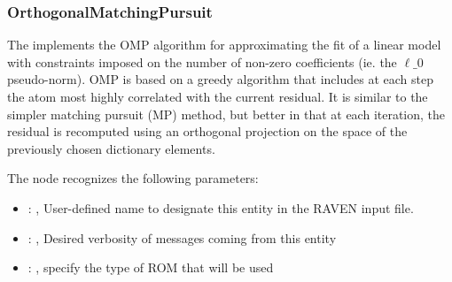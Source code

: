\subsubsection{OrthogonalMatchingPursuit}
  The                          implements the OMP algorithm for
  approximating the fit of a                         linear model with constraints imposed on the
  number of non-zero                         coefficients (ie. the $\ell\_0$ pseudo-norm). OMP is
  based on a greedy                         algorithm that includes at each step the atom most
  highly correlated                         with the current residual. It is similar to the simpler
  matching                         pursuit (MP) method, but better in that at each iteration, the
  residual                         is recomputed using an orthogonal projection on the space of the
  previously chosen dictionary elements.

  The  node recognizes the following parameters:
    \begin{itemize}
      \item {}: , 
        User-defined name to designate this entity in the RAVEN input file.
      \item {}: , 
        Desired verbosity of messages coming from this entity
      \item {}: , 
        specify the type of ROM that will be used
  \end{itemize}

